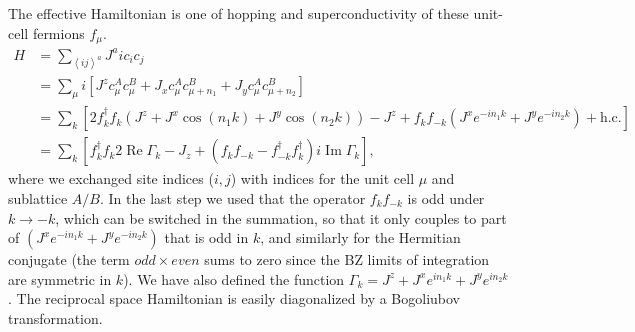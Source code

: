 \documentclass[aps,pra,preprint,groupedaddress]{revtex4-1}
\DeclareMathOperator{\re}{Re}
\DeclareMathOperator{\im}{Im}
\newcommand{\1}{\mathds{1}}
\begin{document}
The effective Hamiltonian is one of hopping and superconductivity of these unit-cell fermions $f_\mu$.
\begin{align} %
H &= \sum_{\left<ij\right>^a} J^a i c_i c_j \nonumber\\
&= \sum_{\mu} i \left[ J^z  c_\mu^A c^B_\mu + J_x  c_\mu^A c^B_{\mu+n_1} + J_y  c_\mu^A c^B_{\mu+n_2} \right] \nonumber \\
&= \sum_k \left[ 2 f^\dagger_k f_k \left( J^z + J^x \cos(n_1 k) + J^y \cos(n_2 k) \right) - J^z + f_k f_{-k} \left( J^x e^{-in_1 k} + J^y e^{-in_2 k}  \right) + \textrm{h.c.} \right] \nonumber \\ %
&= \sum_k \left[f^\dagger_k f_k 2 \re \Gamma_k - J_z + \left(f_k f_{-k} - f^\dagger_{-k} f^\dagger_k \right) i \im \Gamma_k \right],
\label{fHam}
\end{align}
where we exchanged site indices ($i,j$) with indices for the unit cell $\mu$ and sublattice $A/B$. In the last step we used that the operator $f_k f_{-k}$ is odd under $k \to -k$, which can be switched in the summation, so that it only couples to part of $\left( J^x e^{-in_1 k} + J^y e^{-in_2 k}  \right)$ that is odd in $k$, and similarly for the Hermitian conjugate (the term $odd \times even$ sums to zero since the BZ limits of integration are symmetric in $k$). We have also defined the function $\Gamma_k = J^z + J^x e^{i n_1 k} + J^y e^{i n_2 k}$.
The reciprocal space Hamiltonian is easily diagonalized by a Bogoliubov transformation. 
\end{document}
